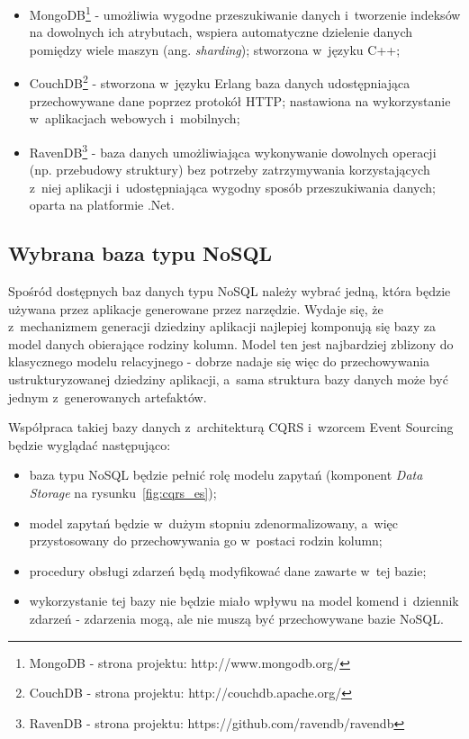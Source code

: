 \begin{itemize}
 \item MongoDB\footnote{MongoDB - strona projektu: http://www.mongodb.org/} - umożliwia wygodne przeszukiwanie danych i~tworzenie indeksów na dowolnych ich atrybutach, wspiera automatyczne dzielenie danych pomiędzy wiele maszyn (ang. \emph{sharding}); stworzona w~języku C++;
 \item CouchDB\footnote{CouchDB - strona projektu: http://couchdb.apache.org/} - stworzona w~języku Erlang baza danych udostępniająca przechowywane dane poprzez protokół HTTP; nastawiona na wykorzystanie w~aplikacjach webowych i~mobilnych;
 \item RavenDB\footnote{RavenDB - strona projektu: https://github.com/ravendb/ravendb} - baza danych umożliwiająca wykonywanie dowolnych operacji (np. przebudowy struktury) bez potrzeby zatrzymywania korzystających z~niej aplikacji i~udostępniająca wygodny sposób przeszukiwania danych; oparta na platformie .Net.
\end{itemize}


\subsection{Wybrana baza typu NoSQL}

Spośród dostępnych baz danych typu NoSQL należy wybrać jedną, która będzie używana przez aplikacje generowane przez narzędzie.
Wydaje się, że z~mechanizmem generacji dziedziny aplikacji najlepiej komponują się bazy za model danych obierające rodziny kolumn.
Model ten jest najbardziej zblizony do klasycznego modelu relacyjnego - dobrze nadaje się więc do przechowywania ustrukturyzowanej dziedziny aplikacji, a~sama struktura bazy danych może być jednym z~generowanych artefaktów.

Współpraca takiej bazy danych z~architekturą CQRS i~wzorcem Event Sourcing będzie wyglądać następująco:

\begin{itemize}
 \item baza typu NoSQL będzie pełnić rolę modelu zapytań (komponent \emph{Data Storage} na rysunku~\ref{fig:cqrs_es});
 \item model zapytań będzie w~dużym stopniu zdenormalizowany, a~więc przystosowany do przechowywania go w~postaci rodzin kolumn;
 \item procedury obsługi zdarzeń będą modyfikować dane zawarte w~tej bazie;
 \item wykorzystanie tej bazy nie będzie miało wpływu na model komend i~dziennik zdarzeń - zdarzenia mogą, ale nie muszą być przechowywane bazie NoSQL.
\end{itemize}

